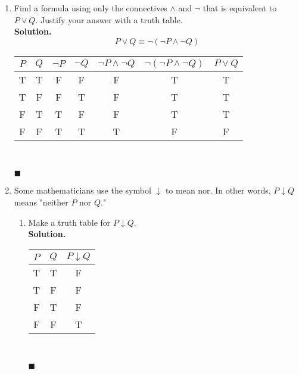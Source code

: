 \documentclass{report}
\newcommand{\sol}{\vspace{1em}\\\textbf{Solution.}\vspace{0.5em}}
\newcommand{\qed}{\ \\\strut\hfill$\blacksquare$\vspace{1em}}
\begin{document}
\begin{enumerate}[leftmargin=*]
    \item Find a formula using only the connectives $\wedge$ and $\neg$ that is
          equivalent to $P \vee Q$. Justify your answer with a truth table. \sol{}
          \[
              P \vee Q \equiv \neg(\neg P \wedge \neg Q)
          \]
          \begin{center}
              \begin{tabular}{ccccccc}
                  $P$ & $Q$ & $\neg P$ & $\neg Q$ & $\neg P \wedge \neg Q$ & $\neg(\neg P \wedge \neg Q)$ & $P \vee Q$ \\
                  \hline
                  T   & T   & F        & F        & F                      & T                            & T          \\
                  T   & F   & F        & T        & F                      & T                            & T          \\
                  F   & T   & T        & F        & F                      & T                            & T          \\
                  F   & F   & T        & T        & T                      & F                            & F
              \end{tabular}
          \end{center}\qed

    \item Some mathematicians use the symbol $\downarrow$ to mean nor. In other words, $P
              \downarrow Q$ means "neither $P$ nor $Q$."
          \begin{enumerate}
              \item Make a truth table for $P \downarrow Q$. \sol{}
                    \begin{center}
                        \begin{tabular}{ccc}
                            $P$ & $Q$ & $P \downarrow Q$ \\
                            \hline
                            T   & T   & F                \\
                            T   & F   & F                \\
                            F   & T   & F                \\
                            F   & F   & T
                        \end{tabular}
                    \end{center}\qed


\end{enumerate}
\end{enumerate}
\end{document}
